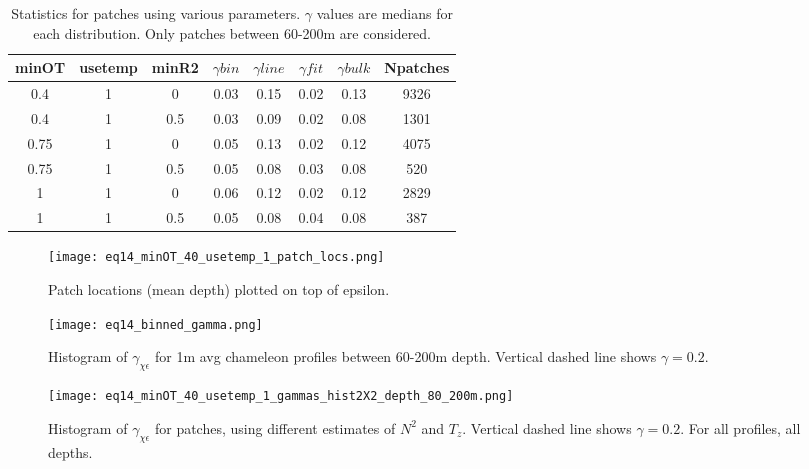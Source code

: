 \documentclass[11pt]{article}
\begin{document}
\begin{table}[htdp]
\caption{Statistics for patches using various parameters. $\gamma$ values are medians for each distribution. Only patches between 60-200m are considered.}
\begin{center}
\begin{tabular}{|c|c|c|c|c|c|c|c|}
\hline
minOT & usetemp & minR2 & $\gamma bin$ & $\gamma line$ & $\gamma fit$ & $\gamma bulk$ & Npatches \\
\hline
0.4 & 1 & 0 & 0.03 & 0.15 & 0.02 & 0.13 & 9326 \\
\hline
0.4 & 1 & 0.5 & 0.03 & 0.09 & 0.02 & 0.08 & 1301 \\
\hline
0.75 & 1 & 0 & 0.05 & 0.13 & 0.02 & 0.12 & 4075 \\
\hline
0.75 & 1 & 0.5 & 0.05 & 0.08 & 0.03 & 0.08 & 520 \\
\hline
1 & 1 & 0 & 0.06 & 0.12 & 0.02 & 0.12 & 2829 \\
\hline
1 & 1 & 0.5 & 0.05 & 0.08 & 0.04 & 0.08 & 387 \\
\hline
\hline
\hline
\end{tabular}
\end{center}
\label{tab}
\end{table}%


\begin{figure}[htbp]
\texttt{[image: eq14\_minOT\_40\_usetemp\_1\_patch\_locs.png]}
\caption{Patch locations (mean depth) plotted on top of epsilon.}
\label{}
\end{figure}


\begin{figure}[htbp]
\texttt{[image: eq14\_binned\_gamma.png]}
\caption{Histogram of $\gamma_{\chi\epsilon}$ for 1m avg chameleon profiles between 60-200m depth. Vertical dashed line shows $\gamma=0.2$.}
\label{avggam}
\end{figure}

\begin{figure}[htbp]
\texttt{[image: eq14\_minOT\_40\_usetemp\_1\_gammas\_hist2X2\_depth\_80\_200m.png]}
\caption{Histogram of $\gamma_{\chi\epsilon}$ for patches, using different estimates of $N^2$ and $T_z$. Vertical dashed line shows $\gamma=0.2$. For all profiles, all depths.}
\label{patchgam}
\end{figure}

\end{document}
